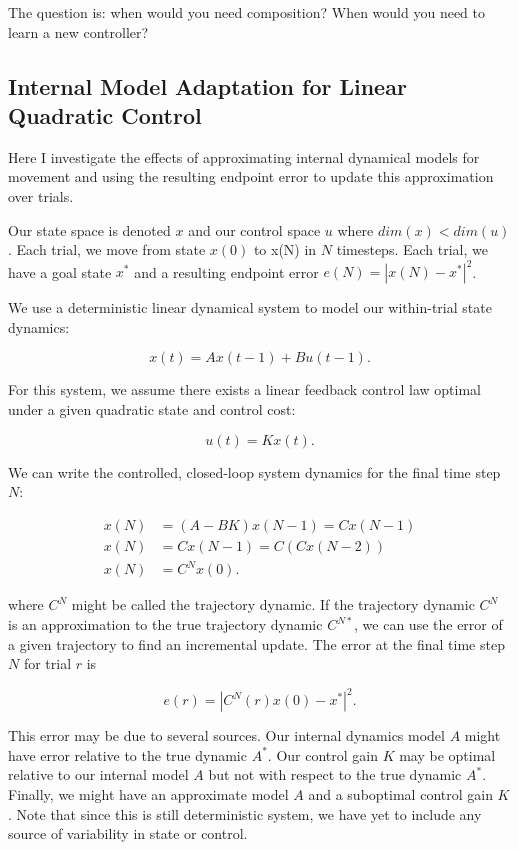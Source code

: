 \documentclass[
  a4paper,
]{article}
\begin{document}
The question is: when would you need composition? When would you need to
learn a new controller?

\hypertarget{internal-model-adaptation-for-linear-quadratic-control}{%
\subsection{Internal Model Adaptation for Linear Quadratic
Control}\label{internal-model-adaptation-for-linear-quadratic-control}}

Here I investigate the effects of approximating internal dynamical
models for movement and using the resulting endpoint error to update
this approximation over trials.

Our state space is denoted \(x\) and our control space \(u\) where
\(dim(x) < dim(u)\). Each trial, we move from state \(x(0)\) to x(N) in
\(N\) timesteps. Each trial, we have a goal state \(x^*\) and a
resulting endpoint error \(e(N) = |x(N) - x^*|^2\).

We use a deterministic linear dynamical system to model our within-trial
state dynamics:

\[
x(t) = Ax(t-1) + Bu(t-1).
\]

For this system, we assume there exists a linear feedback control law
optimal under a given quadratic state and control cost:

\[
u(t) = Kx(t).
\]

We can write the controlled, closed-loop system dynamics for the final
time step \(N\):

\[
\begin{aligned} 
x(N) &= (A - BK)x(N-1) = Cx(N-1) \\
x(N) &= Cx(N-1) = C(Cx(N-2)) \\
x(N) &= C^Nx(0).
\end{aligned} 
\]

where \(C^N\) might be called the trajectory dynamic. If the trajectory
dynamic \(C^N\) is an approximation to the true trajectory dynamic
\(C^{N*}\), we can use the error of a given trajectory to find an
incremental update. The error at the final time step \(N\) for trial
\(r\) is

\[
e(r) = |C^N(r)x(0) - x^*|^2.
\]

This error may be due to several sources. Our internal dynamics model
\(A\) might have error relative to the true dynamic \(A^*\). Our control
gain \(K\) may be optimal relative to our internal model \(A\) but not
with respect to the true dynamic \(A^*\). Finally, we might have an
approximate model \(A\) and a suboptimal control gain \(K\). Note that
since this is still deterministic system, we have yet to include any
source of variability in state or control.
\end{document}
